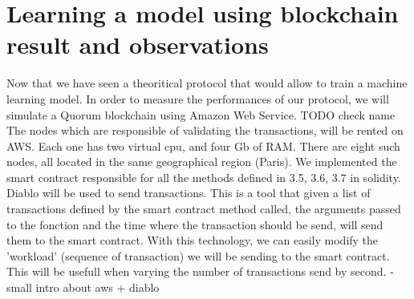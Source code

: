 \documentclass{article}
\begin{document}
\section{Learning a model using blockchain result and observations}
Now that we have seen a theoritical protocol that would allow to train a machine learning model.
In order to measure the performances of our protocol, we will simulate a Quorum blockchain using Amazon Web Service. TODO check name
The nodes which are responsible of validating the transactions, will be rented on AWS. Each one has two virtual cpu, and
four Gb of RAM. There are eight such nodes, all located in the same geographical region (Paris). We implemented the
smart contract responsible for all the methods defined in {3.5, 3.6, 3.7} in solidity. Diablo will be used to send
transactions. This is a tool that given a list of transactions defined by the smart contract method
called, the arguments passed to the fonction and the time where the transaction should be send, will send them to the
smart contract. With this technology, we can easily modify the 'workload' (sequence of transaction) we will be sending
to the smart contract. This will be usefull when varying the number of transactions send by second.
- small intro about aws + diablo
\end{document}

